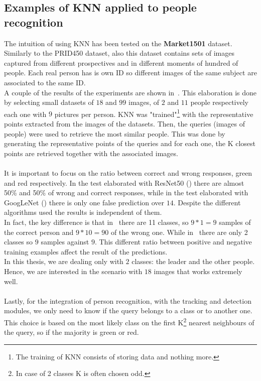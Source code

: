 \subsection{Examples of KNN applied to people recognition}
The intuition of using KNN has been tested on the \textbf{Market1501}\cite{market1501} dataset. Similarly to the PRID450 dataset, also this dataset contains sets of images captured from different prospectives and in different moments of hundred of people. Each real person has is own ID so different images of the same subject are associated to the same ID.\\
A couple of the results of the experiments are shown in~. This elaboration is done by selecting small datasets of $18$ and $99$ images, of $2$ and $11$ people respectively each one with $9$ pictures per person. KNN was "trained"\footnote{The training of KNN consists of storing data and nothing more.} with the representative points extracted from the images of the datasets. Then, the queries (images of people) were used to retrieve the most similar people. This was done by generating the representative points of the queries and for each one, the K closest points are retrieved together with the associated images.\\
\\
It is important to focus on the ratio between correct and wrong responses, green and red respectively. In the test elaborated with ResNet50 () there are almost 50\% and 50\% of wrong and correct responses, while in the test elaborated with GoogLeNet () there is only one false prediction over $14$. Despite the different algorithms used the results is independent of them.\\
In fact, the key difference is that in~ there are 11 classes, so $9*1=9$ samples of the correct person and $9*10=90$ of the wrong one. While in~ there are only 2 classes so $9$ samples against $9$. This different ratio between positive and negative training examples affect the result of the predictions.\\
In this thesis, we are dealing only with $2$ classes: the leader and the other people. Hence, we are interested in the scenario with $18$ images that works extremely well.\\
\\
Lastly, for the integration of person recognition, with the tracking and detection modules, we only need to know if the query belongs to a class or to another one. This choice is based on the most likely class on the first K\footnote{In case of 2 classes K is often chosen odd.}  nearest neighbours of the query, so if the majority is green or red.

